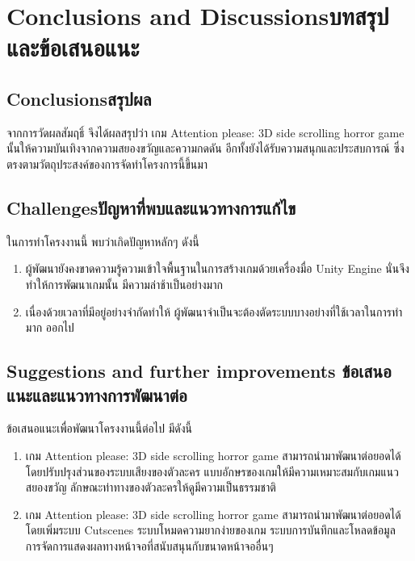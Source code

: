 \chapter{\ifenglish Conclusions and Discussions\else บทสรุปและข้อเสนอแนะ\fi}

\section{\ifenglish Conclusions\else สรุปผล\fi}
จากการวัดผลสัมฤธิ์ จึงได้ผลสรุปว่า เกม Attention please: 3D side scrolling horror game นั้นให้ความบันเทิงจากความสยองขวัญและความกดดัน อีกทั้งยังได้รับความสนุกและประสบการณ์ ซึ่งตรงตามวัตถุประสงค์ของการจัดทำโครงการนี้ขึ้นมา

\section{\ifenglish Challenges\else ปัญหาที่พบและแนวทางการแก้ไข\fi}

ในการทำโครงงานนี้ พบว่าเกิดปัญหาหลักๆ ดังนี้
\begin{enumerate}
    \item ผู้พัฒนายังคงขาดความรู้ความเข้าใจพื้นฐานในการสร้างเกมด้วยเครื่องมื่อ Unity Engine นั่นจึงทำให้การพัฒนาเกมนั้น มีความล่าช้าเป็นอย่างมาก
    \item เนื่องด้วยเวลาที่มีอยู่อย่างจำกัดทำให้ ผู้พัฒนาจำเป็นจะต้องตัดระบบบางอย่างที่ใช้เวลาในการทำมาก ออกไป
\end{enumerate}

\section{\ifenglish%
Suggestions and further improvements
\else%
ข้อเสนอแนะและแนวทางการพัฒนาต่อ
\fi
}

ข้อเสนอแนะเพื่อพัฒนาโครงงานนี้ต่อไป มีดังนี้
\begin{enumerate}
    \item เกม Attention please: 3D side scrolling horror game สามารถนำมาพัฒนาต่อยอดได้ โดยปรับปรุงส่วนของระบบเสียงของตัวละคร แบบอักษรของเกมให้มีความเหมาะสมกับเกมแนวสยองขวัญ ลักษณะท่าทางของตัวละครให้ดูมีความเป็นธรรมชาติ
    \item เกม Attention please: 3D side scrolling horror game สามารถนำมาพัฒนาต่อยอดได้ โดยเพิ่มระบบ Cutscenes ระบบโหมดความยากง่ายของเกม ระบบการบันทึกและโหลดข้อมูล การจัดการแสดงผลทางหน้าจอที่สนับสนุนกับขนาดหน้าจออื่นๆ
\end{enumerate}